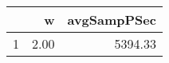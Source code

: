 \begin{table}[h]
\centering
\begin{tabular}{rrr}
  \hline
 & w & avgSampPSec \\ 
  \hline
1 & 2.00 & 5394.33 \\ 
   \hline
\end{tabular}
\end{table}
